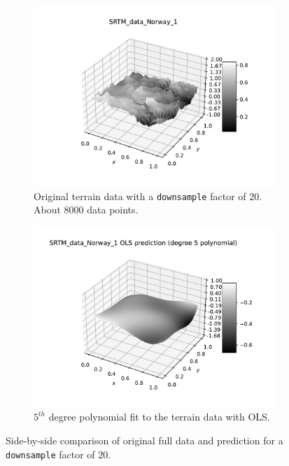 \documentclass[10pt, a4paper]{article}
\begin{document}
    \begin{figure}[h]
        \centering
        \begin{subfigure}{.49\textwidth}
            \centering
            \includegraphics[scale=0.45]{old_ex6/ex6_original_data.pdf}
            \caption{Original terrain data with a \texttt{downsample} factor of $20$. About $8000$ data points.} 
            \label{fig:ex6-og_ds}
        \end{subfigure}
        \begin{subfigure}{.49\textwidth}
            \centering
            \includegraphics[scale=0.45]{old_ex6/ex6_pred_OLS.pdf} 
            \caption{$5^{th}$ degree polynomial fit to the terrain data with OLS.}
            \label{fig:ex6-pred_ds}
        \end{subfigure}
        \caption{Side-by-side comparison of original full data and prediction for a \texttt{downsample} factor of $20$.}
        \label{fig:ex6-downsample_only}
    \end{figure}
    
\end{document}
